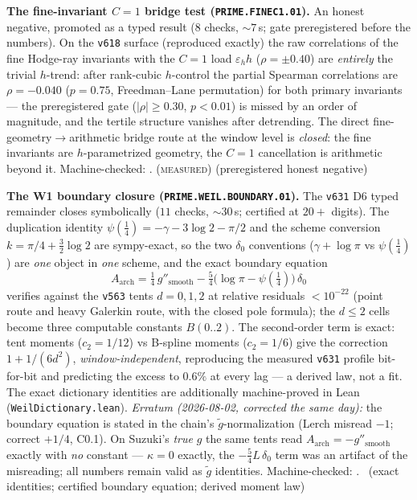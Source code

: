 \par\smallskip\noindent\textbf{The fine-invariant $C=1$ bridge test
(\texttt{PRIME.FINEC1.01}).}
An honest negative, promoted as a typed result ($8$ checks,
${\sim}7$\,s; gate preregistered before the numbers).  On the
\texttt{v618} surface (reproduced exactly) the raw correlations of the
fine Hodge-ray invariants with the $C=1$ load $\varepsilon_h h$
($\rho=\pm0.40$) are \emph{entirely} the trivial $h$-trend: after
rank-cubic $h$-control the partial Spearman correlations are
$\rho=-0.040$ ($p=0.75$, Freedman--Lane permutation) for both primary
invariants --- the preregistered gate ($|\rho|\ge0.30$, $p<0.01$) is
missed by an order of magnitude, and the tertile structure vanishes
after detrending.  The direct fine-geometry$\to$arithmetic bridge
route at the window level is \emph{closed}: the fine invariants are
$h$-parametrized geometry, the $C=1$ cancellation is arithmetic beyond
it.
Machine-checked: .
(\textsc{measured}) (preregistered honest negative)
\par\smallskip


\par\smallskip\noindent\textbf{The W1 boundary closure
(\texttt{PRIME.WEIL.BOUNDARY.01}).}
The \texttt{v631} D6 typed remainder closes symbolically ($11$ checks,
${\sim}30$\,s; certified at $20{+}$ digits).  The duplication identity
$\psi(\tfrac14)=-\gamma-3\log2-\pi/2$ and the scheme conversion
$k=\pi/4+\tfrac32\log2$ are sympy-exact, so the two $\delta_0$
conventions ($\gamma{+}\log\pi$ vs $\psi(\tfrac14)$) are \emph{one}
object in \emph{one} scheme, and the exact boundary equation
\[
A_{\mathrm{arch}}
 =\tfrac14\,g''_{\mathrm{smooth}}
 -\tfrac54\bigl(\log\pi-\psi(\tfrac14)\bigr)\,\delta_0
\]
verifies against the \texttt{v563} tents $d=0,1,2$ at relative
residuals $<10^{-22}$ (point route and heavy Galerkin route, with the
closed pole formula); the $d\le2$ cells become three computable
constants $B(0..2)$.  The second-order term is exact: tent moments
($c_2=1/12$) vs B-spline moments ($c_2=1/6$) give the correction
$1+1/(6d^2)$, \emph{window-independent}, reproducing the measured
\texttt{v631} profile bit-for-bit and predicting the excess to $0.6\%$
at every lag --- a derived law, not a fit.  The exact dictionary
identities are additionally machine-proved in Lean
(\texttt{WeilDictionary.lean}).
\emph{Erratum (2026-08-02, corrected the same day):} the boundary
equation is stated in the chain's $\tilde g$-normalization (Lerch
misread $-1$; correct $+1/4$,  C0.1).  On
Suzuki's \emph{true} $g$ the same tents read
$A_{\mathrm{arch}}=-g''_{\mathrm{smooth}}$ exactly with \emph{no}
constant --- $\kappa=0$ exactly, the $-\tfrac54 L\,\delta_0$ term was
an artifact of the misreading; all numbers remain valid as $\tilde g$
identities.
Machine-checked: .
\mE\ (exact identities; certified boundary equation; derived moment
law)
\par\smallskip


